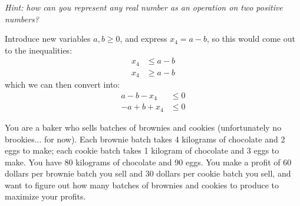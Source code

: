 \documentclass[11pt]{article}
\begin{document}
\begin{subparts}
  \emph{Hint: how can you represent any real number as an operation on two positive numbers?}

  \begin{solution}
  	Introduce new variables \(a, b \ge  0\), and express \(x_4 = a - b\), so this would come out to the 
	inequalities:
	\begin{align*}
		x_4 &\le  a - b\\
		x_4 &\ge  a - b
	\end{align*}
	which we can then convert into:
	\begin{align*}
		a - b - x_4 &\le  0\\
		-a + b + x_4 & \le 0
	\end{align*}
  \end{solution}
\end{subparts}

\newpage



You are a baker who sells batches of brownies and cookies (unfortunately no brookies... for now). Each brownie batch takes 4 kilograms of chocolate and 2 eggs to make; each cookie batch takes 1 kilogram of chocolate and 3 eggs to make. You have 80 kilograms of chocolate and 90 eggs. You make a profit of 60 dollars per brownie batch you sell and 30 dollars per cookie batch you sell, and want to figure out how many batches of brownies and cookies to produce to maximize your profits.
\end{document}
